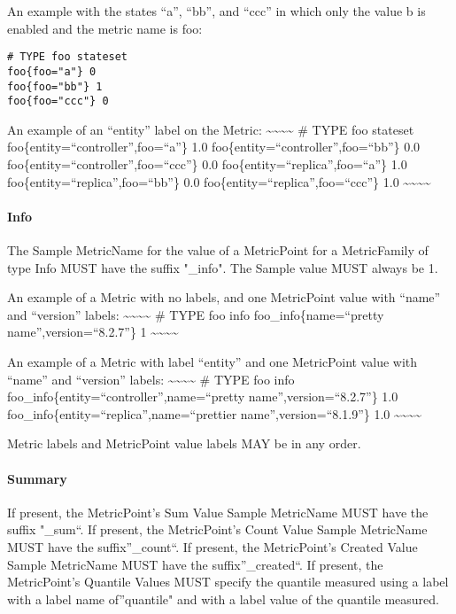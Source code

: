 \documentclass[a4paper,12pt,notitlepage,twoside,openright]{article}
\begin{document}
An example with the states ``a'', ``bb'', and ``ccc'' in which only the
value b is enabled and the metric name is foo:

\begin{verbatim}
# TYPE foo stateset
foo{foo="a"} 0
foo{foo="bb"} 1
foo{foo="ccc"} 0
\end{verbatim}

An example of an ``entity'' label on the Metric:
\textasciitilde\textasciitilde\textasciitilde\textasciitilde{} \# TYPE
foo stateset foo\{entity=``controller'',foo=``a''\} 1.0
foo\{entity=``controller'',foo=``bb''\} 0.0
foo\{entity=``controller'',foo=``ccc''\} 0.0
foo\{entity=``replica'',foo=``a''\} 1.0
foo\{entity=``replica'',foo=``bb''\} 0.0
foo\{entity=``replica'',foo=``ccc''\} 1.0
\textasciitilde\textasciitilde\textasciitilde\textasciitilde{}

\hypertarget{info-1}{%
\paragraph{Info}\label{info-1}}

The Sample MetricName for the value of a MetricPoint for a MetricFamily
of type Info MUST have the suffix "\_info". The Sample value MUST always
be 1.

An example of a Metric with no labels, and one MetricPoint value with
``name'' and ``version'' labels:
\textasciitilde\textasciitilde\textasciitilde\textasciitilde{} \# TYPE
foo info foo\_info\{name=``pretty name'',version=``8.2.7''\} 1
\textasciitilde\textasciitilde\textasciitilde\textasciitilde{}

An example of a Metric with label ``entity'' and one MetricPoint value
with ``name'' and ``version'' labels:
\textasciitilde\textasciitilde\textasciitilde\textasciitilde{} \# TYPE
foo info foo\_info\{entity=``controller'',name=``pretty
name'',version=``8.2.7''\} 1.0
foo\_info\{entity=``replica'',name=``prettier name'',version=``8.1.9''\}
1.0 \textasciitilde\textasciitilde\textasciitilde\textasciitilde{}

Metric labels and MetricPoint value labels MAY be in any order.

\hypertarget{summary-1}{%
\paragraph{Summary}\label{summary-1}}

If present, the MetricPoint's Sum Value Sample MetricName MUST have the
suffix "\_sum``. If present, the MetricPoint's Count Value Sample
MetricName MUST have the suffix''\_count``. If present, the
MetricPoint's Created Value Sample MetricName MUST have the
suffix''\_created``. If present, the MetricPoint's Quantile Values MUST
specify the quantile measured using a label with a label name
of''quantile" and with a label value of the quantile measured.
\end{document}
